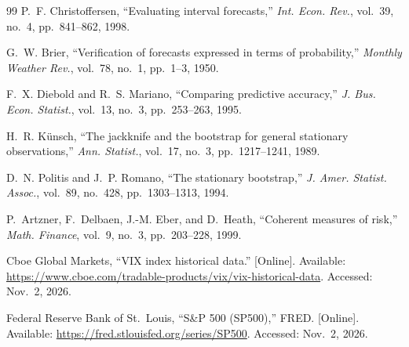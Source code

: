 \documentclass[conference]{IEEEtran}
\begin{document}
\begin{thebibliography}{99}
P.~F. Christoffersen, ``Evaluating interval forecasts,'' \emph{Int. Econ. Rev.}, vol.~39, no.~4, pp.~841--862, 1998.

G.~W. Brier, ``Verification of forecasts expressed in terms of probability,'' \emph{Monthly Weather Rev.}, vol.~78, no.~1, pp.~1--3, 1950.

F.~X. Diebold and R.~S. Mariano, ``Comparing predictive accuracy,'' \emph{J. Bus. Econ. Statist.}, vol.~13, no.~3, pp.~253--263, 1995.

H.~R. K\"unsch, ``The jackknife and the bootstrap for general stationary observations,'' \emph{Ann. Statist.}, vol.~17, no.~3, pp.~1217--1241, 1989.

D.~N. Politis and J.~P. Romano, ``The stationary bootstrap,'' \emph{J. Amer. Statist. Assoc.}, vol.~89, no.~428, pp.~1303--1313, 1994.

P.~Artzner, F.~Delbaen, J.-M. Eber, and D.~Heath, ``Coherent measures of risk,'' \emph{Math. Finance}, vol.~9, no.~3, pp.~203--228, 1999.

Cboe Global Markets, ``VIX index historical data.'' [Online]. Available: \url{https://www.cboe.com/tradable-products/vix/vix-historical-data}. Accessed: Nov.~2, 2026.

Federal Reserve Bank of St.~Louis, ``S\&P 500 (SP500),'' FRED. [Online]. Available: \url{https://fred.stlouisfed.org/series/SP500}. Accessed: Nov.~2, 2026.

\end{thebibliography}
\end{document}
